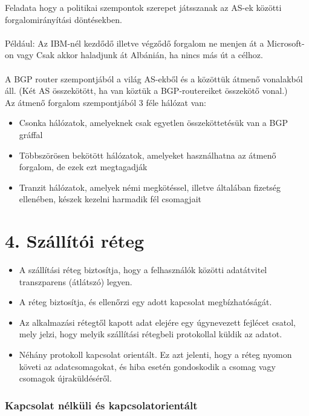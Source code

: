 \documentclass[12pt]{article}
\begin{document}
\begin{itemize}[leftmargin=7.5mm]
        Feladata hogy a politikai szempontok szerepet játsszanak az AS-ek közötti forgalomirányítási döntésekben.\\\\
        {\small Például: Az IBM-nél kezdődő illetve végződő forgalom ne menjen át a Microsoft-on vagy Csak akkor haladjunk át Albánián, ha nincs más út a célhoz.}\\\\
        A BGP router szempontjából a világ AS-ekből és a közöttük átmenő vonalakból áll. (Két AS összekötött, ha van köztük a BGP-routereiket összekötő vonal.)\\
        Az átmenő forgalom szempontjából 3 féle hálózat van:
        \begin{itemize}
            \item Csonka hálózatok, amelyeknek csak egyetlen összeköttetésük van a BGP gráffal
            \item Többszörösen bekötött hálózatok, amelyeket használhatna az átmenő forgalom, de ezek ezt megtagadják
            \item Tranzit hálózatok, amelyek némi megkötéssel, illetve általában fizetség ellenében, készek kezelni harmadik fél csomagjait
        \end{itemize}
	\end{itemize}

	\section*{4. Szállítói réteg}

    \begin{itemize}
        \item A szállítási réteg biztosítja, hogy a felhasználók közötti adatátvitel transzparens (átlátszó) legyen.
        \item A réteg biztosítja, és ellenőrzi egy adott kapcsolat megbízhatóságát.
        \item Az alkalmazási rétegtől kapott adat elejére egy úgynevezett fejlécet csatol, mely jelzi, hogy melyik szállítási rétegbeli protokollal küldik az adatot.
        \item Néhány protokoll kapcsolat orientált. Ez azt jelenti, hogy a réteg nyomon követi az adatcsomagokat, és hiba esetén gondoskodik a csomag vagy csomagok újraküldéséről.
    \end{itemize}
			
	\subsubsection*{Kapcsolat nélküli és kapcsolatorientált}
\end{document}
